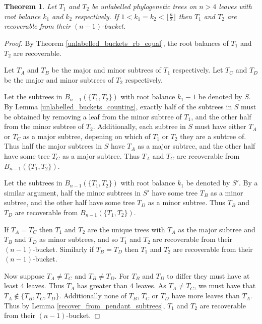 \documentclass[12pt]{article}
\newtheorem{Theorem}{Theorem}[section]
\theoremstyle{definition}
\begin{document}
\begin{Theorem}\label{unlabelled_buckets_theorem2}
    Let $T_1$ and $T_2$ be unlabelled phylogenetic trees on $n>4$ leaves with root balance $k_1$ and $k_2$ respectively. If $1 < k_1 = k_2 < \lfloor\frac{n}{2}\rfloor$ then $T_1$ and $T_2$ are recoverable from their $(n-1)$-bucket.
\end{Theorem}

\begin{proof}
    By Theorem \ref{unlabelled_buckets_rb_equal}, the root balances of $T_1$ and $T_2$ are recoverable.

    Let $T_A$ and $T_B$ be the major and minor subtrees of $T_1$ respectively. Let $T_C$ and $T_D$ be the major and minor subtrees of $T_2$ respectively.
    
    Let the subtrees in $B_{n-1}(\{T_1, T_2\})$ with root balance $k_1-1$ be denoted by $S$. By Lemma \ref{unlabelled_buckets_counting}, exactly half of the subtrees in $S$ must be obtained by removing a leaf from the minor subtree of $T_1$, and the other half from the minor subtree of $T_2$. Additionally, each subtree in $S$ must have either $T_A$ or $T_C$ as a major subtree, depening on which of $T_1$ or $T_2$ they are a subtree of. Thus half the major subtrees in $S$ have $T_A$ as a major subtree, and the other half have some tree $T_C$ as a major subtree. Thus $T_A$ and $T_C$ are recoverable from $B_{n-1}(\{T_1, T_2\})$.

    Let the subtrees in $B_{n-1}(\{T_1, T_2\})$ with root balance $k_1$ be denoted by $S'$. By a similar argument, half the minor subtrees in $S'$ have some tree $T_B$ as a minor subtree, and the other half have some tree $T_D$ as a minor subtree. Thus $T_B$ and $T_D$ are recoverable from $B_{n-1}(\{T_1, T_2\})$.

    If $T_A = T_C$ then $T_1$ and $T_2$ are the unique trees with $T_A$ as the major subtree and $T_B$ and $T_D$ as minor subtrees, and so $T_1$ and $T_2$ are recoverable from their $(n-1)$-bucket. Similarly if $T_B = T_D$ then $T_1$ and $T_2$ are recoverable from their $(n-1)$-bucket.

    Now suppose $T_A \neq T_C$ and $T_B \neq T_D$. For $T_B$ and $T_D$ to differ they must have at least $4$ leaves. Thus $T_A$ has greater than $4$ leaves. As $T_A \neq T_C$, we must have that $T_A \notin \{T_B, T_C, T_D\}$. Additionally none of $T_B$, $T_C$ or $T_D$ have more leaves than $T_A$. Thus by Lemma \ref{recover_from_pendant_subtrees}, $T_1$ and $T_2$ are recoverable from their $(n-1)$-bucket.
\end{proof}
\end{document}
